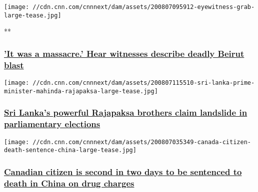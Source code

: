 \texttt{[image: //cdn.cnn.com/cnnnext/dam/assets/200807095912-eyewitness-grab-large-tease.jpg]}

**

\hypertarget{it-was-a-massacre-hear-witnesses-describe-deadly-beirut-blast}{%
\subsubsection{\texorpdfstring{\href{/videos/world/2020/08/06/beirut-blast-eyewitness-reaction-lon-orig-na.cnn}{'It
was a massacre.' Hear witnesses describe deadly Beirut
blast}}{'It was a massacre.' Hear witnesses describe deadly Beirut blast}}\label{it-was-a-massacre-hear-witnesses-describe-deadly-beirut-blast}}

\href{/2020/08/07/asia/sri-lanka-election-mahinda-rajapaksa-intl-hnk/index.html}{}

\texttt{[image: //cdn.cnn.com/cnnnext/dam/assets/200807115510-sri-lanka-prime-minister-mahinda-rajapaksa-large-tease.jpg]}

\hypertarget{sri-lankas-powerful-rajapaksa-brothers-claim-landslide-in-parliamentary-elections}{%
\subsubsection{\texorpdfstring{\href{/2020/08/07/asia/sri-lanka-election-mahinda-rajapaksa-intl-hnk/index.html}{Sri
Lanka's powerful Rajapaksa brothers claim landslide in parliamentary
elections}}{Sri Lanka's powerful Rajapaksa brothers claim landslide in parliamentary elections}}\label{sri-lankas-powerful-rajapaksa-brothers-claim-landslide-in-parliamentary-elections}}

\href{/2020/08/07/china/canada-citizen-death-sentence-china-intl-hnk/index.html}{}

\texttt{[image: //cdn.cnn.com/cnnnext/dam/assets/200807035349-canada-citizen-death-sentence-china-large-tease.jpg]}

\hypertarget{canadian-citizen-is-second-in-two-days-to-be-sentenced-to-death-in-china-on-drug-charges}{%
\subsubsection{\texorpdfstring{\href{/2020/08/07/china/canada-citizen-death-sentence-china-intl-hnk/index.html}{Canadian
citizen is second in two days to be sentenced to death in China on drug
charges}}{Canadian citizen is second in two days to be sentenced to death in China on drug charges}}\label{canadian-citizen-is-second-in-two-days-to-be-sentenced-to-death-in-china-on-drug-charges}}

